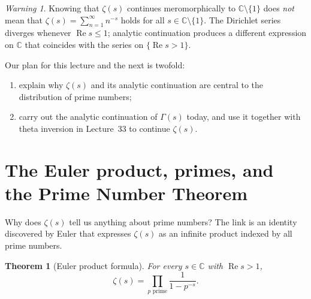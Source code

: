 \documentclass[11pt]{article}
\theoremstyle{plain}
\newtheorem{theorem}{Theorem}[section]
\theoremstyle{definition}
\theoremstyle{boldremark}
\theoremstyle{remark}
\newtheorem*{warning}{Warning}
\numberwithin{equation}{section}
\newcommand{\C}{\mathbb{C}}
\DeclareMathOperator{\Real}{Re}
\begin{document}
\begin{warning}
Knowing that $\zeta(s)$ continues meromorphically to $\C\setminus\{1\}$
does \emph{not} mean that $\zeta(s)=\sum_{n=1}^{\infty} n^{-s}$ holds for
all $s\in\C\setminus\{1\}$. The Dirichlet series diverges whenever
$\Real s\leq 1$; analytic continuation produces a different expression on
$\C$ that coincides with the series on $\{\Real s > 1\}$.
\end{warning}

Our plan for this lecture and the next is twofold:
\begin{enumerate}[label=\textup{(\arabic*)}]
 \item explain why $\zeta(s)$ and its analytic continuation are central to
       the distribution of prime numbers;
 \item carry out the analytic continuation of $\Gamma(s)$ today, and use it
       together with theta inversion in Lecture~33 to continue $\zeta(s)$.
\end{enumerate}


\section{The Euler product, primes, and the Prime Number Theorem}

Why does $\zeta(s)$ tell us anything about prime numbers? The link is an
identity discovered by Euler that expresses $\zeta(s)$ as an infinite
product indexed by all prime numbers.

\begin{theorem}[Euler product formula]\label{thm:euler-product}
For every $s\in\C$ with $\Real s > 1$,
\begin{equation}\label{eq:euler-product}
 \boxed{\displaystyle
  \zeta(s) = \prod_{p\text{ prime}} \frac{1}{1-p^{-s}}.}
\end{equation}
\end{theorem}
\end{document}
